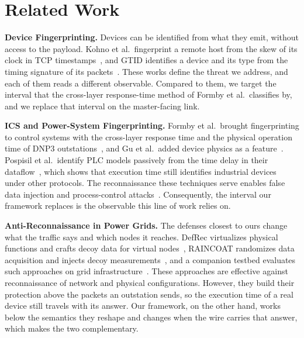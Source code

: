 \section{Related Work}
\label{sec:related}

\textbf{Device Fingerprinting.} Devices can be identified from what they emit, without access to the
payload. Kohno et al.\ fingerprint a remote host from the skew of its clock in TCP
timestamps~\cite{kohno2005}, and GTID identifies a device and its type from the
timing signature of its packets~\cite{gtid2015}. These works define
the threat we address, and each of them reads a different observable. Compared to them, we target the
interval that the cross-layer response-time method of Formby et al.\ classifies by, and we replace
that interval on the master-facing link.

\textbf{ICS and Power-System Fingerprinting.} Formby et al.\ brought fingerprinting to control
systems with the cross-layer response time and the physical operation time of DNP3
outstations~\cite{formby2016}, and Gu et al.\ added device physics as a
feature~\cite{gu2018}. Pospisil et al.\ identify PLC models
passively from the time delay in their
dataflow~\cite{pospisil2023}, which shows that execution time still
identifies industrial devices under other protocols. The reconnaissance these techniques serve
enables false data injection and process-control
attacks~\cite{liufdia2009, cardenas2011}. Consequently, the
interval our framework replaces is the observable this line of work relies on.

\textbf{Anti-Reconnaissance in Power Grids.} The defenses closest to ours change what the traffic says
and which nodes it reaches. DefRec virtualizes physical functions and crafts decoy data for virtual
nodes~\cite{defrec2020}, RAINCOAT randomizes data acquisition and injects
decoy measurements~\cite{raincoat2019}, and a companion testbed evaluates such
approaches on grid infrastructure~\cite{lintestbed2020}. These approaches are
effective against reconnaissance of network and physical configurations. However, they build their
protection above the packets an outstation sends, so the execution time of a real device still
travels with its answer. Our framework, on the other hand, works below the semantics they reshape
and changes when the wire carries that answer, which makes the two complementary.

